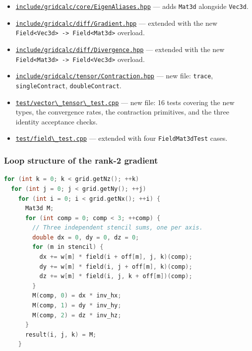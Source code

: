 \begin{itemize}
\tightlist
\item
  \href{../../../include/gridcalc/core/EigenAliases.hpp}{\passthrough{\lstinline!include/gridcalc/core/EigenAliases.hpp!}}
  — adds \passthrough{\lstinline!Mat3d!} alongside
  \passthrough{\lstinline!Vec3d!}.
\item
  \href{../../../include/gridcalc/diff/Gradient.hpp}{\passthrough{\lstinline!include/gridcalc/diff/Gradient.hpp!}}
  — extended with the new
  \passthrough{\lstinline!Field<Vec3d> -> Field<Mat3d>!} overload.
\item
  \href{../../../include/gridcalc/diff/Divergence.hpp}{\passthrough{\lstinline!include/gridcalc/diff/Divergence.hpp!}}
  — extended with the new
  \passthrough{\lstinline!Field<Mat3d> -> Field<Vec3d>!} overload.
\item
  \href{../../../include/gridcalc/tensor/Contraction.hpp}{\passthrough{\lstinline!include/gridcalc/tensor/Contraction.hpp!}}
  — new file: \passthrough{\lstinline!trace!},
  \passthrough{\lstinline!singleContract!},
  \passthrough{\lstinline!doubleContract!}.
\item
  \href{../../../test/vector_tensor_test.cpp}{\passthrough{\lstinline!test/vector\_tensor\_test.cpp!}}
  — new file: 16 tests covering the new types, the convergence rates,
  the contraction primitives, and the three identity acceptance
  checks.
\item
  \href{../../../test/field_test.cpp}{\passthrough{\lstinline!test/field\_test.cpp!}}
  — extended with four
  \passthrough{\lstinline!FieldMat3dTest!} cases.
\end{itemize}

\subsubsection{Loop structure of the rank-2
gradient}\label{phase13-grad-loop}

\begin{lstlisting}[language={C++}]
for (int k = 0; k < grid.getNz(); ++k)
  for (int j = 0; j < grid.getNy(); ++j)
    for (int i = 0; i < grid.getNx(); ++i) {
      Mat3d M;
      for (int comp = 0; comp < 3; ++comp) {
        // Three independent stencil sums, one per axis.
        double dx = 0, dy = 0, dz = 0;
        for (m in stencil) {
          dx += w[m] * field(i + off[m], j, k)(comp);
          dy += w[m] * field(i, j + off[m], k)(comp);
          dz += w[m] * field(i, j, k + off[m])(comp);
        }
        M(comp, 0) = dx * inv_hx;
        M(comp, 1) = dy * inv_hy;
        M(comp, 2) = dz * inv_hz;
      }
      result(i, j, k) = M;
    }
\end{lstlisting}

